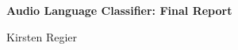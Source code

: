 \documentclass[11pt, letterpaper]{article}
\begin{document}

\begin{center}
\Large{\textbf{Audio Language Classifier: Final Report}}

\large{Kirsten Regier}
\end{center}




\end{document}
